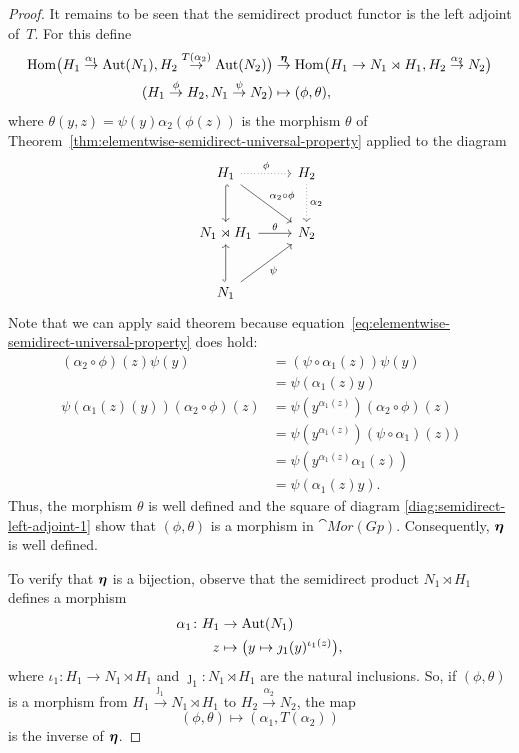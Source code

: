 \begin{proof}
    It remains to be seen that the semidirect product functor is the left adjoint of~$T$. For this define
    \begin{align*}
        {\rm Hom}\big(H_1\stackrel{\alpha_1}
            \to {\rm Aut}(N_1),H_2\stackrel{T(\alpha_2)}\to{\rm Aut}(N_2)\big)
        &\stackrel{\textrm{\boldmath$\eta$}}\to
            {\rm Hom}\big(H_1\to N_1\rtimes H_1,H_2\stackrel{\alpha_2}
            \to N_2\big)\\
        (H_1\stackrel\phi\to H_2,N_1\stackrel\psi\to N_2)
            &\mapsto(\phi,\theta),
    \end{align*}
    where $\theta(y,z)=\psi(y)\alpha_2(\phi(z))$ is the morphism $\theta$ of Theorem~\ref{thm:elementwise-semidirect-universal-property} applied to the diagram
    \begin{equation}\label{diag:semidirect-left-adjoint-1}
        \begin{tikzcd}[row sep=large]
            H_1
                    \arrow[d,hook]
                    \arrow[rd,"\alpha_2\circ\phi"]
                    \arrow[r,"\phi",dotted]
                &H_2
                    \arrow[d,"\alpha_2",dotted]\\
            N_1\rtimes H_1
                    \arrow[r,"\theta"]
                &N_2\\
            N_1
                \arrow[u,hook]
                \arrow[ru,"\psi"']&
        \end{tikzcd}
    \end{equation}
    Note that we can apply said theorem because equation~\eqref{eq:elementwise-semidirect-universal-property} does hold:
    \begin{align*}
        (\alpha_2\circ\phi)(z)\psi(y) &=(\psi\circ\alpha_1(z))\psi(y)\\
            &= \psi(\alpha_1(z)y)\\
        \psi(\alpha_1(z)(y))(\alpha_2\circ\phi)(z)
            &= \psi(y^{\alpha_1(z)})(\alpha_2\circ\phi)(z)\\
            &= \psi(y^{\alpha_1(z)})(\psi\circ\alpha_1)(z))\\
            &= \psi(y^{\alpha_1(z)}\alpha_1(z))\\
            &= \psi(\alpha_1(z)y).
    \end{align*}
    Thus, the morphism $\theta$ is well defined and the square of diagram \eqref{diag:semidirect-left-adjoint-1} show that $(\phi,\theta)$ is a morphism in $\cat{Mor(Gp)}$. Consequently, $\textrm{\boldmath$\eta$}$ is well defined.

    To verify that $\textrm{\boldmath$\eta$}$ is a bijection, observe that the semidirect product $N_1\rtimes H_1$ defines a morphism
    \begin{align*}
        \alpha_1\colon H_1&\to{\rm Aut}(N_1)\\
        z&\mapsto\big(y\mapsto \jmath_1(y)^{\iota_1(z)}\big),
    \end{align*}
    where $\iota_1\colon H_1\to N_1\rtimes H_1$ and $\jmath_1\colon N_1\rtimes H_1$ are the natural inclusions. So, if $(\phi,\theta)$ is a morphism from $H_1\stackrel{\jmath_1}\to N_1\rtimes H_1$ to $H_2\stackrel{\alpha_2}\to N_2$, the map
    $$
        (\phi,\theta)\mapsto(\alpha_1,T(\alpha_2))
    $$
    is the inverse of $\textrm{\boldmath$\eta$}$.


\end{proof}
